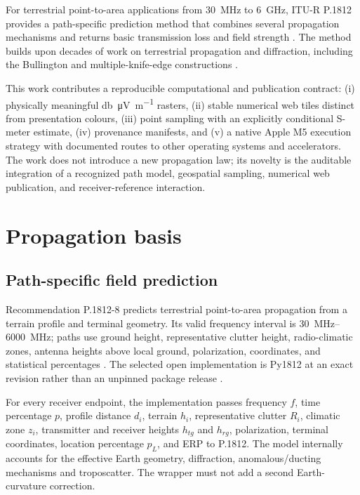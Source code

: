\documentclass[10pt,a4paper,twocolumn]{article}
\begin{document}
For terrestrial point-to-area applications from \SI{30}{\mega\hertz} to
\SI{6}{\giga\hertz}, ITU-R P.1812 provides a path-specific prediction method
that combines several propagation mechanisms and returns basic transmission
loss and field strength \cite{iturp1812}. The method builds upon decades of
work on terrestrial propagation and diffraction, including the Bullington and
multiple-knife-edge constructions \cite{bullington1947,deygout1966}.

This work contributes a reproducible computational and publication contract:
(i) physically meaningful \si{\decibel\micro\volt\per\meter} rasters,
(ii) stable numerical web tiles distinct from presentation colours,
(iii) point sampling with an explicitly conditional S-meter estimate,
(iv) provenance manifests, and (v) a native Apple M5 execution strategy with
documented routes to other operating systems and accelerators. The work does
not introduce a new propagation law; its novelty is the auditable integration
of a recognized path model, geospatial sampling, numerical web publication,
and receiver-reference interaction.

\section{Propagation basis}

\subsection{Path-specific field prediction}

Recommendation P.1812-8 predicts terrestrial point-to-area propagation from a
terrain profile and terminal geometry. Its valid frequency interval is
\SIrange{30}{6000}{\mega\hertz}; paths use ground height, representative clutter
height, radio-climatic zones, antenna heights above local ground, polarization,
coordinates, and statistical percentages \cite{iturp1812}. The selected open
implementation is Py1812 at an exact revision rather than an unpinned package
release \cite{py1812}.

For every receiver endpoint, the implementation passes frequency $f$, time
percentage $p$, profile distance $d_i$, terrain $h_i$, representative clutter
$R_i$, climatic zone $z_i$, transmitter and receiver heights $h_{tg}$ and
$h_{rg}$, polarization, terminal coordinates, location percentage $p_L$, and
ERP to P.1812. The model internally accounts for the effective Earth geometry,
diffraction, anomalous/ducting mechanisms and troposcatter. The wrapper must not
add a second Earth-curvature correction.
\end{document}
